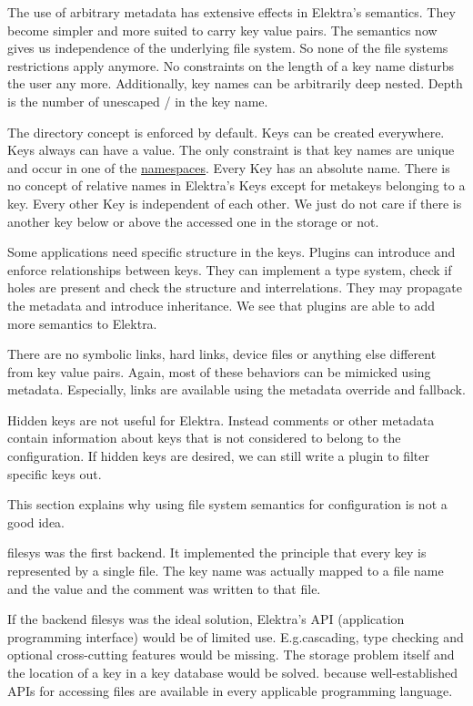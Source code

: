 The use of arbitrary metadata has extensive effects in Elektra’s semantics. They become simpler and more suited to carry key value pairs. The semantics now gives us independence of the underlying file system. So none of the file system\textquotesingle{}s restrictions apply anymore. No constraints on the length of a key name disturbs the user any more. Additionally, key names can be arbitrarily deep nested. Depth is the number of unescaped {\ttfamily /} in the key name.

The directory concept is enforced by default. Keys can be created everywhere. Keys always can have a value. The only constraint is that key names are unique and occur in one of the \mbox{\hyperlink{doc_help_elektra-namespaces_md}{namespaces}}. Every Key has an absolute name. There is no concept of relative names in Elektra’s Keys except for metakeys belonging to a key. Every other Key is independent of each other. We just do not care if there is another key below or above the accessed one in the storage or not.

Some applications need specific structure in the keys. Plugins can introduce and enforce relationships between keys. They can implement a type system, check if holes are present and check the structure and interrelations. They may propagate the metadata and introduce inheritance. We see that plugins are able to add more semantics to Elektra.

There are no symbolic links, hard links, device files or anything else different from key value pairs. Again, most of these behaviors can be mimicked using metadata. Especially, links are available using the metadata {\ttfamily override} and {\ttfamily fallback}.

Hidden keys are not useful for Elektra. Instead comments or other metadata contain information about keys that is not considered to belong to the configuration. If hidden keys are desired, we can still write a plugin to filter specific keys out.

This section explains why using file system semantics for configuration is not a good idea.

{\ttfamily filesys} was the first backend. It implemented the principle that every key is represented by a single file. The key name was actually mapped to a file name and the value and the comment was written to that file.

If the backend {\ttfamily filesys} was the ideal solution, Elektra’s A\+PI (application programming interface) would be of limited use. E.\+g.\+cascading, type checking and optional cross-\/cutting features would be missing. The storage problem itself and the location of a key in a key database would be solved. because well-\/established A\+P\+Is for accessing files are available in every applicable programming language.

